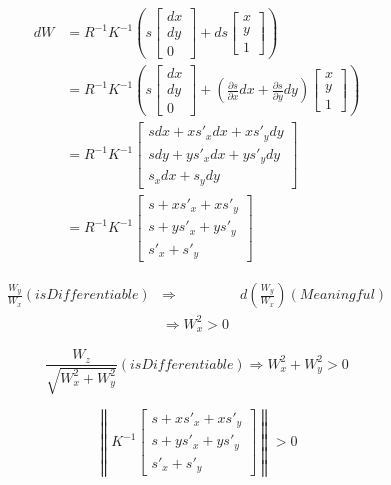 \documentclass{ctexart}
\begin{document}
	\begin{equation}
	\begin{split}
	dW
	& = R^{-1} K^{-1} \left(
	s \begin{bmatrix} dx \\ dy \\ 0 \end{bmatrix}
	+
	ds \begin{bmatrix} x \\ y \\ 1 \end{bmatrix}
	\right)
	\\
	& = R^{-1} K^{-1} \left(
	s \begin{bmatrix} dx \\ dy \\ 0 \end{bmatrix}
	+
	\left(\frac{\partial s}{\partial x} dx + \frac{\partial s}{\partial y} dy\right) \begin{bmatrix} x \\ y \\ 1 \end{bmatrix}
	\right)
	\\
	& = R^{-1} K^{-1}
	\begin{bmatrix}
	s dx + x s'_x dx + x s'_y dy \\
	s dy + y s'_x dx + y s'_y dy \\
	s_x dx + s_y dy
	\end{bmatrix}
	\\
	& = R^{-1} K^{-1}
	\begin{bmatrix}
	s + x s'_x + x s'_y \\
	s + y s'_x + y s'_y \\
	s'_x + s'_y
	\end{bmatrix}
	\end{split}
	\end{equation}
	
	\begin{equation}
	\begin{aligned}
	\frac{W_y}{W_x} (is Differentiable) & \Rightarrow & d(\frac{W_y}{W_x})(Meaningful) \\
	& \Rightarrow W_x^2 > 0
	\end{aligned}
	\end{equation}
	
	\begin{equation}
	\frac{W_z}{\sqrt{W_x^2+W_y^2}} (is Differentiable) \Rightarrow W_x^2 + W_y^2 > 0
	\end{equation}
	
	\begin{equation}
	\left\|
	K^{-1}
	\begin{bmatrix}
	s + x s'_x + x s'_y \\
	s + y s'_x + y s'_y \\
	s'_x + s'_y
	\end{bmatrix}
	\right\|
	> 0
	\end{equation}
\end{document}

